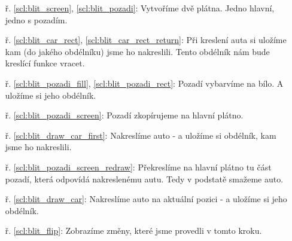 \begin{minipage}[t]{.45\textwidth}
\begin{enumerate}
\item[ř. \ref{scl:blit_screen}, \ref{scl:blit_pozadi}:] Vytvoříme dvě plátna. Jedno hlavní, jedno s pozadím.
\item[ř. \ref{scl:blit_car_rect}, \ref{scl:blit_car_rect_return}:] Při kreslení auta si uložíme kam (do jakého obdélníku) jsme ho nakreslili. Tento obdélník nám bude kreslící funkce vracet.
\vspace{2cm}
\item[ř. \ref{scl:blit_pozadi_fill}, \ref{scl:blit_pozadi_rect}:] Pozadí vybarvíme na bílo. A uložíme si jeho obdélník.
\item[ř. \ref{scl:blit_pozadi_screen}:] Pozadí zkopírujeme na hlavní plátno.
\item[ř. \ref{scl:blit_draw_car_first}:] Nakreslíme auto - a uložíme si obdélník, kam jsme ho nakreslili.
\item[ř. \ref{scl:blit_pozadi_screen_redraw}:] Překreslíme na hlavní plátno tu část pozadí, která odpovídá nakreslenému autu. Tedy v podstatě smažeme auto.
\vspace{7cm}
\item[ř. \ref{scl:blit_draw_car}:] Nakreslíme auto na aktuální pozici - a uložíme si jeho obdélník.
\item[ř. \ref{scl:blit_flip}:] Zobrazíme změny, které jsme provedli v tomto kroku.
\end{enumerate}
\end{minipage}





